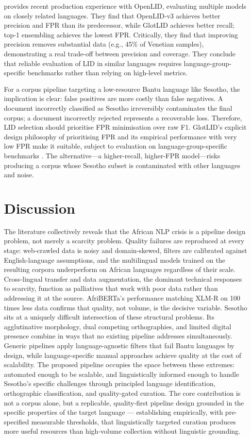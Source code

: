 \documentclass[11pt,a4paper]{article}
\begin{document}
\citet{fedorova2026openlid} provides recent production experience with OpenLID, evaluating multiple models on closely related languages. They find that OpenLID-v3 achieves better precision and FPR than its predecessor, while GlotLID achieves better recall; top-1 ensembling achieves the lowest FPR. Critically, they find that improving precision removes substantial data (e.g., 45\% of Venetian samples), demonstrating a real trade-off between precision and coverage. They conclude that reliable evaluation of LID in similar languages requires language-group-specific benchmarks rather than relying on high-level metrics.

For a corpus pipeline targeting a low-resource Bantu language like Sesotho, the implication is clear: false positives are more costly than false negatives. A document incorrectly classified as Sesotho irreversibly contaminates the final corpus; a document incorrectly rejected represents a recoverable loss. Therefore, LID selection should prioritise FPR minimisation over raw F1. GlotLID's explicit design philosophy of prioritising FPR \citet{kargaran2024glotcc} and its empirical performance with very low FPR make it suitable, subject to evaluation on language-group-specific benchmarks \citep{fedorova2026openlid}. The alternative—a higher-recall, higher-FPR model—risks producing a corpus whose Sesotho subset is contaminated with other languages and noise.
\clearpage
\section{Discussion}
The literature collectively reveals that the African NLP crisis is a pipeline design problem, not merely a scarcity problem. Quality failures are reproduced at every stage: web-crawled data is noisy and domain-skewed, filters are calibrated against English-language assumptions, and the multilingual models trained on the resulting corpora underperform on African languages regardless of their scale. Cross-lingual transfer and data augmentation, the dominant technical responses to scarcity, function as palliatives that work with poor data rather than addressing it at the source. AfriBERTa's performance matching XLM-R on 100 times less data confirms that quality, not volume, is the decisive variable.
Sesotho sits at a uniquely difficult intersection of these structural problems. Its agglutinative morphology, dual competing orthographies, and limited digital presence combine in ways that no existing pipeline addresses simultaneously. Generic pipelines apply language-agnostic filters that fail Bantu languages by design, while language-specific manual approaches achieve quality at the cost of scalability. The proposed pipeline occupies the space between these extremes: automated enough to be scalable, and linguistically informed enough to handle Sesotho's specific challenges through principled language identification, orthographic classification, and quality-gated curation. The core contribution is not a corpus alone, but a replicable, quality-first pipeline design grounded in the specific properties of the target language — establishing empirically, with pre-specified measurable thresholds, that linguistically targeted curation produces more useful resources than high-volume collection without linguistic grounding.
\clearpage
\end{document}
